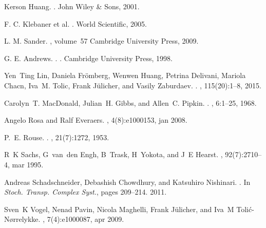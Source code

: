 \documentclass[aps,showpacs,twocolumn,floatfix,prx,superscriptaddress]{revtex4-1}
\begin{document}
\begin{thebibliography}{10}
Kerson Huang.
.
\newblock John Wiley {\&} Sons, 2001.

F. C. Klebaner et al.
.
\newblock World Scientific, 2005.

L. M. Sander.
, volume~57
\newblock Cambridge University Press, 2009.

G. E. Andrews.
.
.
\newblock Cambridge University Press, 1998.


Yen~Ting Lin, Daniela Fr{\"{o}}mberg, Wenwen Huang, Petrina Delivani, Mariola
  Chacn, Iva~M. Tolic, Frank J{\"{u}}licher, and Vasily Zaburdaev.
.
, 115(20):1--8, 2015.

Carolyn~T. MacDonald, Julian~H. Gibbs, and Allen~C. Pipkin.
.
, 6:1--25, 1968.

Angelo Rosa and Ralf Everaers.
, 4(8):e1000153, jan 2008.

P.~E. Rouse.
.
, 21(7):1272, 1953.

R~K Sachs, G~van~den Engh, B~Trask, H~Yokota, and J~E Hearst.
, 92(7):2710--4, mar 1995.

Andreas Schadschneider, Debashish Chowdhury, and Katsuhiro Nishinari.
.
\newblock In {\em Stoch. Transp. Complex Syst.}, pages 209--214. 2011.

Sven~K Vogel, Nenad Pavin, Nicola Maghelli, Frank J{\"{u}}licher, and Iva~M
  Toli{\'{c}}-N{\o}rrelykke.
, 7(4):e1000087, apr 2009.

\end{thebibliography}
\end{document}
